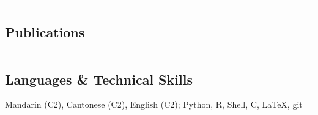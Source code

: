 \documentclass[10pt,a4paper]{article}
\newenvironment{indentsection}[1]%
{\begin{list}{}%
	{\setlength{\leftmargin}{#1}}%
	\item[]%
}
{\end{list}}
\newcommand{\CPP}
{C\nolinebreak[4]\hspace{-.05em}\raisebox{.22ex}{\footnotesize\bf ++}}
\begin{document}

\hrule
\vspace{-1em}
\subsection*{Publications}

\nocite{*} %

\printbibliography[heading=none]



\hrule
\vspace{-1em}
\subsection*{Languages \& Technical Skills}

\begin{indentsection}{\parindent}
	\begin{description*}
		\item {Mandarin (C2), Cantonese (C2), English (C2);
		      Python, R, Shell, \CPP, \LaTeX, git}

	\end{description*}



\end{indentsection}
\end{document}
